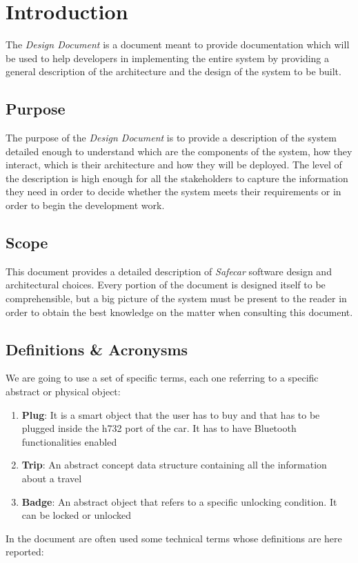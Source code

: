 \chapter{Introduction} \label{chap1}
The \textit{Design Document} is a document meant to provide documentation which will be used to help developers in implementing the entire system by providing a general description of the architecture and the design of the system to be built.

\section{Purpose}
The purpose of the \textit{Design Document} is to provide a description of the system detailed enough to understand which are the components of the system, how they interact, which is their architecture and how they will be deployed. The level of the description is high enough for all the stakeholders to capture the information they need in order to decide whether the system meets their requirements or in order to begin the development work.

\section{Scope}
This document provides a detailed description of \textit{Safecar} software design and architectural choices. Every portion of the document is designed itself to be comprehensible, but a big picture of the system must be present to the reader in order to obtain the best knowledge on the matter when consulting this document.

\section{Definitions \& Acronysms}
We are going to use a set of specific terms, each one referring to a specific abstract or physical object:

\begin{enumerate}
	\item \textbf{Plug}: It is a smart object that the user has to buy and that has to be plugged inside the h732 port of the car. It has to have Bluetooth functionalities enabled
	\item \textbf{Trip}: An abstract concept data structure containing all the information about a travel
	\item \textbf{Badge}: An abstract object that refers to a specific unlocking condition. It can be locked or unlocked
\end{enumerate}
In the document are often used some technical terms whose definitions are here reported:

